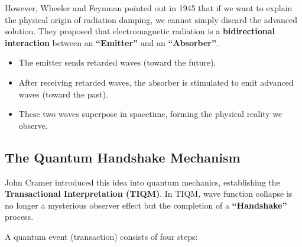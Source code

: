 However, Wheeler and Feynman pointed out in 1945 that if we want to explain the physical origin of radiation damping, we cannot simply discard the advanced solution. They proposed that electromagnetic radiation is a \textbf{bidirectional interaction} between an \textbf{``Emitter''} and an \textbf{``Absorber''}.

\begin{itemize}
\item The emitter sends retarded waves (toward the future).

\item After receiving retarded waves, the absorber is stimulated to emit advanced waves (toward the past).

\item These two waves superpose in spacetime, forming the physical reality we observe.
\end{itemize}

\subsection{The Quantum Handshake Mechanism}

John Cramer introduced this idea into quantum mechanics, establishing the \textbf{Transactional Interpretation (TIQM)}. In TIQM, wave function collapse is no longer a mysterious observer effect but the completion of a \textbf{``Handshake''} process.

A quantum event (transaction) consists of four steps:

